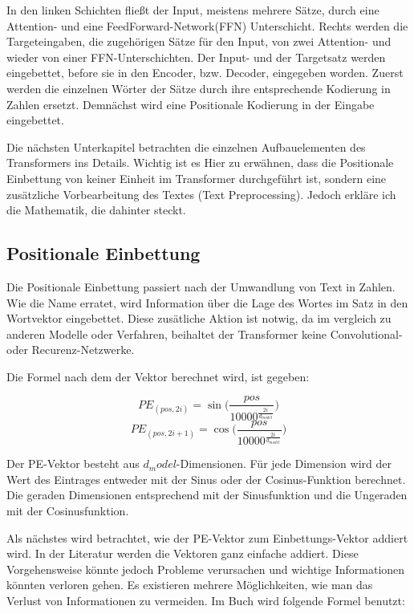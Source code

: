 In den linken Schichten fließt der Input, meistens mehrere Sätze, durch eine Attention- und eine FeedForward-Network(FFN) Unterschicht. Rechts werden die Targeteingaben, die zugehörigen Sätze für den Input, von zwei Attention- und wieder von einer FFN-Unterschichten. Der Input- und der Targetsatz werden eingebettet, before sie in den Encoder, bzw. Decoder, eingegeben worden. Zuerst werden die einzelnen Wörter der Sätze durch ihre entsprechende Kodierung in Zahlen ersetzt. Demnächst wird eine Positionale Kodierung in der Eingabe eingebettet.

Die nächsten Unterkapitel betrachten die einzelnen Aufbauelementen des Transformers ins Details. Wichtig ist es Hier zu erwähnen, dass die Positionale Einbettung von keiner Einheit im Transformer durchgeführt ist, sondern eine zusätzliche Vorbearbeitung des Textes (Text Preprocessing). Jedoch erkläre ich die Mathematik, die dahinter steckt.

\subsection{Positionale Einbettung}
Die Positionale Einbettung passiert nach der Umwandlung von Text in Zahlen. Wie die Name erratet, wird Information über die Lage des Wortes im Satz in den Wortvektor eingebettet. Diese zusätliche Aktion ist notwig, da im vergleich zu anderen Modelle oder Verfahren, beihaltet der Transformer keine Convolutional- oder Recurenz-Netzwerke.

Die Formel nach dem der Vektor berechnet wird, ist gegeben:

\begin{equation}
	PE_{(pos,2i)} = \sin\Bigg(\frac{pos}{10000^\frac{2i}{d_{model}}}\Bigg)
\end{equation}
\begin{equation}
	PE_{(pos,2i+1)} = \cos\Bigg(\frac{pos}{10000^\frac{2i}{d_{model}}}\Bigg)
\end{equation}

Der PE-Vektor besteht aus $d_model$-Dimensionen. Für jede Dimension wird der Wert des Eintrages entweder mit der Sinus oder der Cosinus-Funktion berechnet. Die geraden Dimensionen entsprechend mit der Sinusfunktion und die Ungeraden mit der Cosinusfunktion.

Als nächstes wird betrachtet, wie der PE-Vektor zum Einbettungs-Vektor addiert wird. In der Literatur werden die Vektoren ganz einfache addiert. Diese Vorgehensweise könnte jedoch Probleme verursachen und wichtige Informationen könnten verloren gehen. Es existieren mehrere Möglichkeiten, wie man das Verlust von Informationen zu vermeiden. Im Buch \cite{denis_Transformer:02} wird folgende Formel benutzt:

